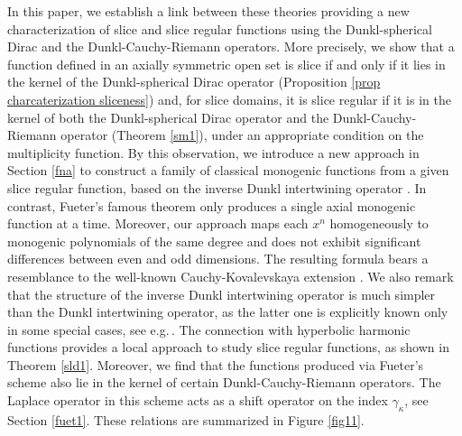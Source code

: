 \documentclass{amsart}
\theoremstyle{definition}
\theoremstyle{remark}
\numberwithin{equation}{section}
\begin{document}
In this paper, we establish a link between these theories providing a new characterization of slice and  slice regular functions using the Dunkl-spherical Dirac and the Dunkl-Cauchy-Riemann operators. More precisely, we show that a function defined in an axially symmetric open set is slice if and only if it lies in the kernel of the Dunkl-spherical Dirac operator (Proposition \ref{prop charcaterization sliceness}) and, for slice domains, it is slice regular if it is in the kernel of both the Dunkl-spherical Dirac operator and the Dunkl-Cauchy-Riemann operator (Theorem \ref{sm1}), under an appropriate condition on the multiplicity function.
By this observation, we introduce a new approach in Section \ref{fna} to construct a family of classical monogenic functions from a given slice regular function, based on the inverse Dunkl intertwining operator \cite{dx1}. In contrast,  Fueter's famous theorem only produces a single axial monogenic function at a time. Moreover, our approach  maps each $x^{n}$ homogeneously to monogenic polynomials of the same degree and does not  exhibit significant differences between even and odd dimensions.  The resulting formula bears a resemblance to the well-known Cauchy-Kovalevskaya extension \cite{dss}. We also remark that the structure of the inverse Dunkl intertwining operator is much simpler than the Dunkl intertwining operator, as the latter one is explicitly known only in some special cases, see e.g.\,\cite{dl, dx1}. The connection with hyperbolic harmonic functions provides a local approach to study  slice regular functions, as shown in Theorem \ref{sld1}. Moreover, we find that the functions produced via Fueter's scheme also lie in the kernel of certain Dunkl-Cauchy-Riemann operators. The Laplace operator in this scheme acts as a shift operator on the index $\gamma_{\kappa}$, see Section  \ref{fuet1}. These  relations are summarized in Figure \ref{fig11}.
\end{document}
